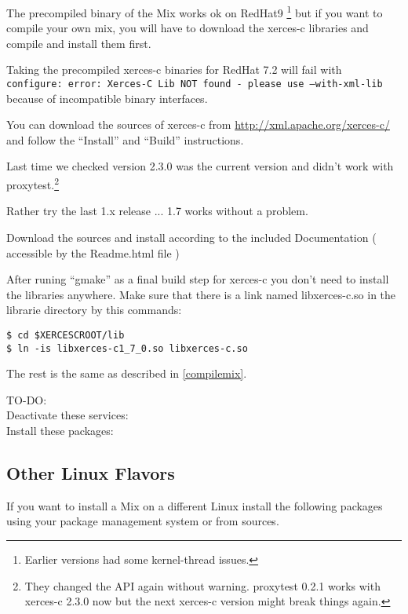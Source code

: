 \documentclass{article}
\begin{document}
The precompiled binary of the Mix works ok on RedHat9
\footnote{Earlier versions had some kernel-thread issues.} but if you
want to compile your own mix, you will have to download the xerces-c libraries and 
compile and install them first.

Taking the precompiled xerces-c binaries for RedHat 7.2 will fail with\\
\texttt{configure: error: Xerces-C Lib NOT found - please use --with-xml-lib}\\
because of incompatible binary interfaces.

You can download the sources of xerces-c from
\url{http://xml.apache.org/xerces-c/} and follow the ``Install'' and
``Build'' instructions.

Last time we checked version 2.3.0 was the current version and didn't
work with proxytest.\footnote{They changed the API again without
  warning. proxytest 0.2.1 works with xerces-c 2.3.0 now but the next
  xerces-c version might break things again.}

Rather try the last 1.x release ... 1.7 works without a problem.

Download the sources and install according to the included Documentation 
( accessible by the Readme.html file )


After runing ``gmake'' as a final build step for xerces-c you don't
need to install the libraries anywhere. 
Make sure that there is a link named libxerces-c.so in the librarie directory by this commands:

\begin{verbatim}
$ cd $XERCESCROOT/lib
$ ln -is libxerces-c1_7_0.so libxerces-c.so
\end{verbatim}


The rest is the same as described in \ref{compilemix}.

TO-DO: \\
Deactivate these services:\\
Install these packages:\\


\subsection{Other Linux Flavors}

If you want to install a Mix on a different Linux install the
following packages using your package management system or from sources.
\end{document}
